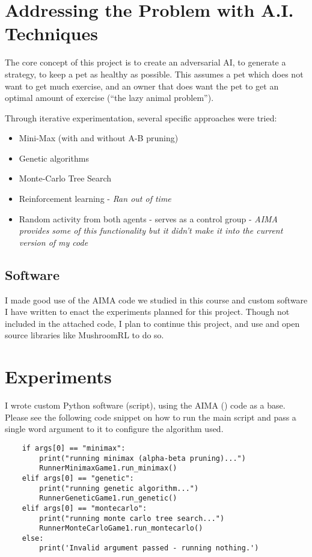 \documentclass{article}
\begin{document}
\section{Addressing the Problem with A.I. Techniques}

The core concept of this project is to create an adversarial AI, to generate a strategy, to keep a pet as healthy as possible. This assumes a pet which does not want to get much exercise, and an owner that does want the pet to get an optimal amount of exercise (``the lazy animal problem'').

Through iterative experimentation, several specific approaches were tried:
\begin{itemize}
    \item Mini-Max (with and without A-B pruning)
    \item Genetic algorithms
    \item Monte-Carlo Tree Search
    \item Reinforcement learning - \textit{Ran out of time}
    \item Random activity from both agents - serves as a control group - \textit{AIMA provides some of this functionality but it didn't make it into the current version of my code}
\end{itemize}

\subsection{Software}
  I made good use of the AIMA code we studied in this course and custom software I have written to enact the experiments planned for this project. 
  Though not included in the attached code, I plan to continue this project, and use and open source libraries like MushroomRL to do so.\cite{mushroom}

\section{Experiments}

I wrote custom Python software (script), using the AIMA (\cite{russell2016artificial}) code as a base. Please see the following code snippet on how to run the main script and pass a single word argument to it to configure the algorithm used.

\begin{lstlisting}
    if args[0] == "minimax":
        print("running minimax (alpha-beta pruning)...")
        RunnerMinimaxGame1.run_minimax()
    elif args[0] == "genetic":
        print("running genetic algorithm...")
        RunnerGeneticGame1.run_genetic()
    elif args[0] == "montecarlo":
        print("running monte carlo tree search...")
        RunnerMonteCarloGame1.run_montecarlo()
    else:
        print('Invalid argument passed - running nothing.')
\end{lstlisting}
\end{document}
